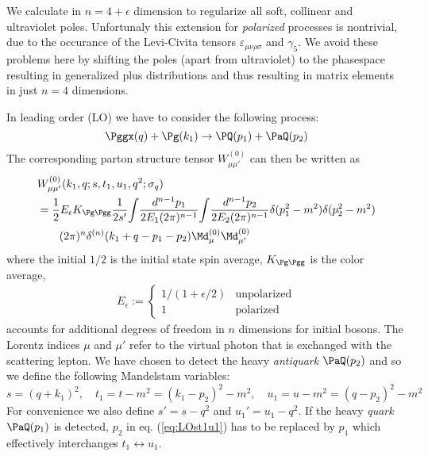 We calculate in $n=4+\epsilon$ dimension to regularize all soft, collinear and ultraviolet poles. Unfortunaly this extension for \textit{polarized} processes is nontrivial, due to the occurance of the Levi-Civita tensors $\varepsilon_{\mu\nu\rho\sigma}$ and $\gamma_5$. We avoid these problems here by shifting the poles (apart from ultraviolet) to the phasespace resulting in generalized plus distributions and thus resulting in matrix elements in just $n=4$ dimensions.

In leading order (LO) we have to consider the following process:
\begin{equation}
\Pggx(q) + \Pg(k_1) \rightarrow \PQ(p_1)+\PaQ(p_2)
\end{equation}
The corresponding parton structure tensor $W_{\mu\mu'}^{(0)}$ can then be written as
\begin{align}
&W_{\mu\mu'}^{(0)}(k_1,q;s,t_1,u_1,q^2;\sigma_{q})\nonumber\\
 &= \frac 1 2 E_\epsilon K_{\Pg\Pgg}\frac{1}{2s'}\!\int\!\frac{d^{n-1}p_1}{2E_1(2\pi)^{n-1}}\!\int\!\frac{d^{n-1}p_2}{2E_2(2\pi)^{n-1}}\delta(p_1^2-m^2) \delta(p_2^2-m^2)\nonumber\\
 &\hspace{20pt}(2\pi)^n\delta^{(n)}(k_1+q-p_1-p_2) \Md_{\mu}^{(0)}\Md_{\mu'}^{(0)}
\label{eq:PartonicStructureTensor0}\end{align}
where the initial $1/2$ is the initial state spin average, $K_{\Pg\Pgg}$ is the color average,
\begin{align}
E_\epsilon := \left\{\begin{array}{ll}
1/(1+\epsilon/2) &\text{unpolarized}\\
1 &\text{polarized}
\end{array}\right.
\end{align}
accounts for additional degrees of freedom in $n$ dimensions for initial bosons. The Lorentz indices $\mu$ and $\mu'$ refer to the virtual photon that is exchanged with the scattering lepton. We have chosen to detect the heavy \textit{antiquark} $\PaQ(p_2)$ and so we define the following Mandelstam variables:
\begin{equation}
s = (q+k_1)^2, \quad t_1=t-m^2=(k_1-p_2)^2-m^2, \quad u_1 = u - m^2 = (q-p_2)^2 -m^2 \label{eq:LOst1u1}
\end{equation}
For convenience we also define $s' = s-q^2$ and $u_1' = u_1 - q^2$. If the heavy \textit{quark} $\PaQ(p_1)$ is detected, $p_2$ in eq. (\ref{eq:LOst1u1}) has to be replaced by $p_1$ which effectively interchanges $t_1\leftrightarrow u_1$.

